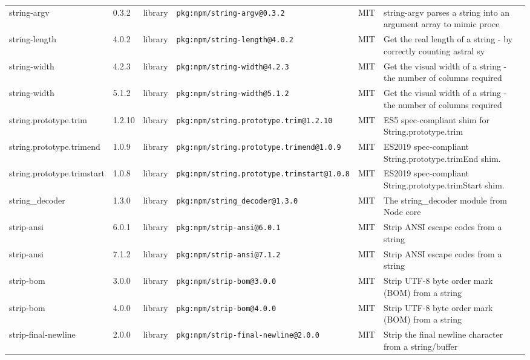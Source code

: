 \documentclass[11pt,a4paper]{article}
\begin{document}
\begin{longtable}{|p{4cm}|p{2cm}|p{1.6cm}|p{5cm}|p{1.5cm}|p{3.5cm}|}
\raggedright string-argv & 0.3.2 & library & \small\texttt{pkg:npm/string-argv@0.3.2} & MIT & \small string-argv parses a string into an argument array to mimic proce \\
\raggedright string-length & 4.0.2 & library & \small\texttt{pkg:npm/string-length@4.0.2} & MIT & \small Get the real length of a string - by correctly counting astral sy \\
\raggedright string-width & 4.2.3 & library & \small\texttt{pkg:npm/string-width@4.2.3} & MIT & \small Get the visual width of a string - the number of columns required \\
\raggedright string-width & 5.1.2 & library & \small\texttt{pkg:npm/string-width@5.1.2} & MIT & \small Get the visual width of a string - the number of columns required \\
\raggedright string.prototype.trim & 1.2.10 & library & \small\texttt{pkg:npm/string.prototype.trim@1.2.10} & MIT & \small ES5 spec-compliant shim for String.prototype.trim \\
\raggedright string.prototype.trimend & 1.0.9 & library & \small\texttt{pkg:npm/string.prototype.trimend@1.0.9} & MIT & \small ES2019 spec-compliant String.prototype.trimEnd shim. \\
\raggedright string.prototype.trimstart & 1.0.8 & library & \small\texttt{pkg:npm/string.prototype.trimstart@1.0.8} & MIT & \small ES2019 spec-compliant String.prototype.trimStart shim. \\
\raggedright string\_decoder & 1.3.0 & library & \small\texttt{pkg:npm/string\_decoder@1.3.0} & MIT & \small The string\_decoder module from Node core \\
\raggedright strip-ansi & 6.0.1 & library & \small\texttt{pkg:npm/strip-ansi@6.0.1} & MIT & \small Strip ANSI escape codes from a string \\
\raggedright strip-ansi & 7.1.2 & library & \small\texttt{pkg:npm/strip-ansi@7.1.2} & MIT & \small Strip ANSI escape codes from a string \\
\raggedright strip-bom & 3.0.0 & library & \small\texttt{pkg:npm/strip-bom@3.0.0} & MIT & \small Strip UTF-8 byte order mark (BOM) from a string \\
\raggedright strip-bom & 4.0.0 & library & \small\texttt{pkg:npm/strip-bom@4.0.0} & MIT & \small Strip UTF-8 byte order mark (BOM) from a string \\
\raggedright strip-final-newline & 2.0.0 & library & \small\texttt{pkg:npm/strip-final-newline@2.0.0} & MIT & \small Strip the final newline character from a string/buffer \\

\end{longtable}
\end{document}
